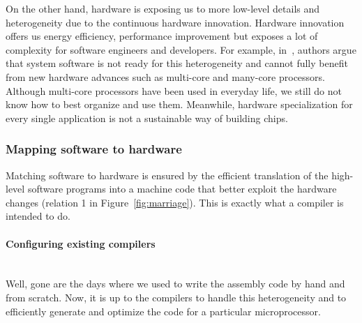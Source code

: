 On the other hand, hardware is exposing us to more low-level details and heterogeneity due to the continuous hardware innovation. 
Hardware innovation offers us energy efficiency, performance improvement but exposes a lot of complexity for software engineers and developers.
For example, in~\cite{he2010computer}, authors argue that system software is not ready for this heterogeneity and cannot fully benefit from new hardware advances such as multi-core and many-core processors. Although multi-core processors have been used in everyday life, we still do not know how to best organize and use them. 
Meanwhile, hardware specialization for every single application is not a sustainable way of building chips.

\subsubsection{Mapping software to hardware}
\label{Mapping software to hardware}
Matching software to hardware is ensured by the efficient translation of the high-level software programs into a machine code that better exploit the hardware changes (relation 1 in Figure~\ref{fig:marriage}). This is exactly what a compiler is intended to do.

\paragraph{Configuring existing compilers}~\\ 
Well, gone are the days where we used to write the assembly code by hand and from scratch. Now, it is up to the compilers to handle this heterogeneity and to efficiently generate and optimize the code for a particular microprocessor. 

